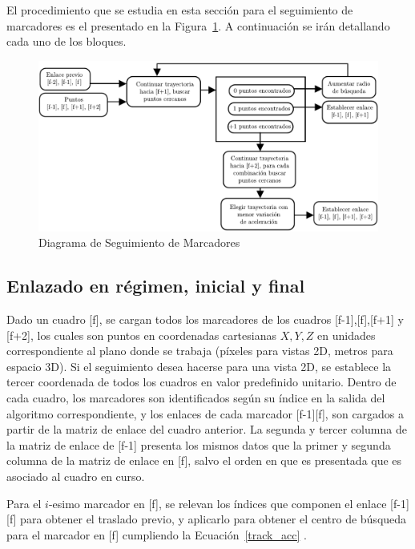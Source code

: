 El procedimiento que se estudia en esta sección para el seguimiento de marcadores es el presentado en la Figura~\ref{diagrama_seguimiento}. A continuación se irán detallando cada uno de los bloques. 
\begin{figure}[ht!]
\hspace{-1cm}
\includegraphics[scale=0.71]{img/Tracking/diagrama_seguimiento}
\caption{Diagrama de Seguimiento de Marcadores}
\label{diagrama_seguimiento}
\end{figure}


\subsection{Enlazado en régimen, inicial y final}

Dado un cuadro [f], se cargan todos los marcadores de los cuadros [f-1],[f],[f+1] y [f+2], los cuales son puntos en coordenadas cartesianas $X,Y,Z$ en unidades correspondiente al plano donde se trabaja (píxeles para vistas 2D, metros para espacio 3D). Si el seguimiento desea hacerse para una vista 2D, se establece la tercer coordenada de todos los cuadros en valor predefinido unitario. Dentro de cada cuadro, los marcadores son identificados según su índice en la salida del algoritmo correspondiente, y los enlaces de cada marcador [f-1][f], son cargados a partir de la matriz de enlace del cuadro anterior. La segunda y tercer columna de la matriz de enlace de [f-1] presenta los mismos datos que la primer y segunda columna de la matriz de enlace en [f], salvo el orden en que es presentada que es asociado al cuadro en curso.

Para el $i$-esimo marcador en [f], se relevan los índices que componen el enlace [f-1][f] para obtener el traslado previo, y aplicarlo para obtener el centro de búsqueda para el marcador en [f] cumpliendo la Ecuación~\ref{track_acc} .

